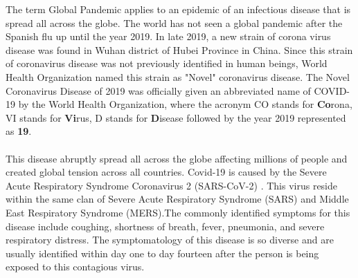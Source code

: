 \documentclass[conference]{IEEEtran}
\begin{document}
    The term Global Pandemic applies to an epidemic of an infectious disease that is spread all across the globe. The world has not seen a global pandemic after the Spanish flu up until the year 2019. In late 2019, a new strain of corona virus disease was found in Wuhan district of Hubei Province in China. Since this strain of coronavirus disease was not previously identified in human beings, World Health Organization named this strain as "Novel" coronavirus disease. The Novel Coronavirus Disease of 2019 was officially given an abbreviated name of COVID-19 by the World Health Organization,  where the acronym CO stands for \textbf{Co}rona, VI stands for \textbf{Vi}rus, D stands for \textbf{D}isease followed by the year 2019 represented as \textbf{19}.    \\\\
    This disease abruptly spread all across the globe affecting millions of people and created global tension across all countries.  Covid-19 is caused by the Severe Acute Respiratory Syndrome Coronavirus 2 (SARS-CoV-2) \cite{walls2020structure}. This virus reside within the same clan of Severe Acute Respiratory Syndrome (SARS) and Middle East Respiratory Syndrome (MERS).The commonly identified symptoms for  this disease include coughing, shortness of breath, fever, pneumonia, and severe respiratory distress. The symptomatology of this disease is so diverse and are usually identified within day one to day fourteen after the person is being exposed to this contagious virus. \\
    
\end{document}
